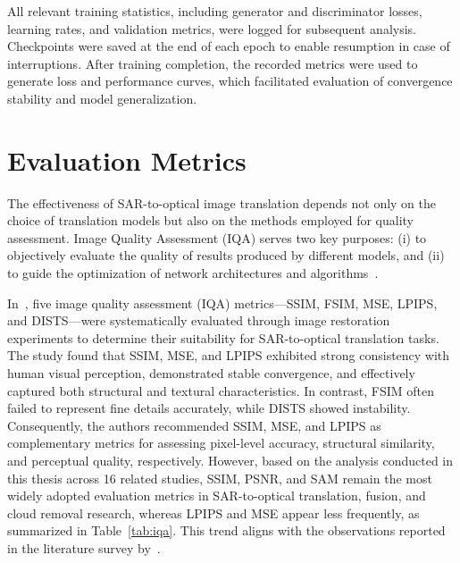 All relevant training statistics, including generator and discriminator losses, learning rates, and validation metrics, were logged for subsequent analysis. Checkpoints were saved at the end of each epoch to enable resumption in case of interruptions. After training completion, the recorded metrics were used to generate loss and performance curves, which facilitated evaluation of convergence stability and model generalization.


\section{Evaluation Metrics}
The effectiveness of SAR-to-optical image translation depends not only on the choice of translation models but also on the methods employed for quality assessment. Image Quality Assessment (IQA) serves two key purposes: (i) to objectively evaluate the quality of results produced by different models, and (ii) to guide the optimization of network architectures and algorithms~\cite{quality_assessment_S2OT}.

In~\cite{quality_assessment_S2OT}, five image quality assessment (IQA) metrics—SSIM, FSIM, MSE, LPIPS, and DISTS—were systematically evaluated through image restoration experiments to determine their suitability for SAR-to-optical translation tasks. The study found that SSIM, MSE, and LPIPS exhibited strong consistency with human visual perception, demonstrated stable convergence, and effectively captured both structural and textural characteristics. In contrast, FSIM often failed to represent fine details accurately, while DISTS showed instability. Consequently, the authors recommended SSIM, MSE, and LPIPS as complementary metrics for assessing pixel-level accuracy, structural similarity, and perceptual quality, respectively. However, based on the analysis conducted in this thesis across 16 related studies, SSIM, PSNR, and SAM remain the most widely adopted evaluation metrics in SAR-to-optical translation, fusion, and cloud removal research, whereas LPIPS and MSE appear less frequently, as summarized in Table~\ref{tab:iqa}. This trend aligns with the observations reported in the literature survey by~\cite{sar_2_opt_CGAN_survey_taxonomy}.

